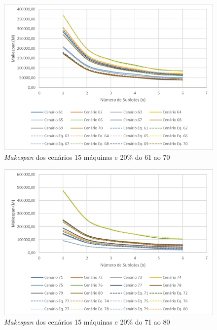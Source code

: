 \begin{figure}[H]
    \centering
     \includegraphics[width=13cm]{Apendices/Figuras/15m20_61-70.png}
     \caption{\textit{Makespan} dos cenários 15 máquinas e 20\% do 61 ao 70}
    \label{fig:15m20_61-70}
\end{figure}

\begin{figure}[H]
    \centering
     \includegraphics[width=13cm]{Apendices/Figuras/15m20_71-80.png}
     \caption{\textit{Makespan} dos cenários 15 máquinas e 20\% do 71 ao 80}
    \label{fig:15m20_71-80}
\end{figure}

